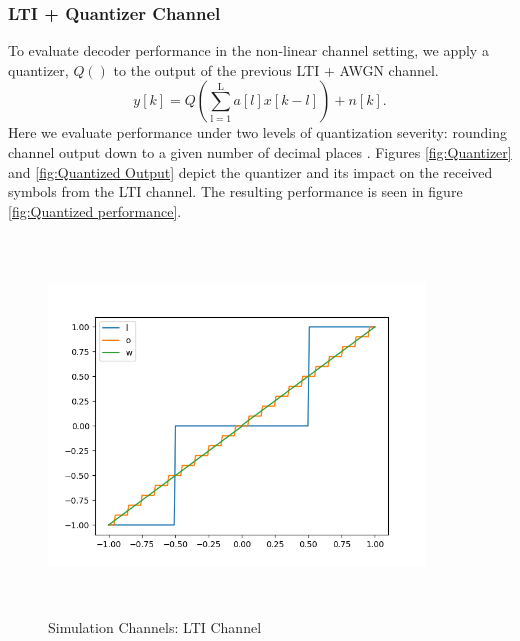 \documentclass[12pt,a4paper]{article}
\begin{document}
\subsubsection{LTI + Quantizer Channel}

To evaluate decoder performance in the non-linear channel setting, we apply a quantizer, $Q()$ to the output of the previous LTI + AWGN channel.
\begin{equation*}
y[k] = Q(\sum_{\mathrm{l=1}}^{\mathrm{L}} a[l]x[k-l]) + n[k].
\end{equation*}
 Here we evaluate performance under two levels of quantization severity: rounding channel output down to a given number of decimal places . Figures \ref{fig:Quantizer} and \ref{fig:Quantized Output} depict the quantizer and its impact on the received symbols from the LTI channel. The resulting performance is seen in figure \ref{fig:Quantized performance}.

\begin{figure}[H]
\centering
	\includegraphics[width=10cm,height = 10cm]{system_model/quantizer}
			  \caption{Simulation Channels: LTI Channel}
	  \label{fig:Quantized Channel}
\end{figure}
\end{document}
